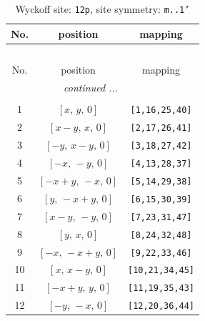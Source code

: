 \documentclass[fleqn,8pt]{jsarticle}
\begin{document}
\begin{longtable}{ccc}
\caption{Wyckoff site: {\tt 12p}, site symmetry: {\tt m..1'}}
 \\
 \hline \hline
No. & position & mapping \\ \hline \endfirsthead

\multicolumn{2}{l}{\tablename\ \thetable{}} \\
 \hline \hline
No. & position & mapping \\ \hline \endhead

 \hline \hline
\multicolumn{2}{r}{\footnotesize\it continued ...} \\ \endfoot

 \hline \hline
\multicolumn{2}{r}{} \\ \endlastfoot

1 & $\left[ x,\, y,\, 0 \right]$ & {\tt [1,16,25,40]} \\ \hline
2 & $\left[ x - y,\, x,\, 0 \right]$ & {\tt [2,17,26,41]} \\ \hline
3 & $\left[ - y,\, x - y,\, 0 \right]$ & {\tt [3,18,27,42]} \\ \hline
4 & $\left[ - x,\, - y,\, 0 \right]$ & {\tt [4,13,28,37]} \\ \hline
5 & $\left[ - x + y,\, - x,\, 0 \right]$ & {\tt [5,14,29,38]} \\ \hline
6 & $\left[ y,\, - x + y,\, 0 \right]$ & {\tt [6,15,30,39]} \\ \hline
7 & $\left[ x - y,\, - y,\, 0 \right]$ & {\tt [7,23,31,47]} \\ \hline
8 & $\left[ y,\, x,\, 0 \right]$ & {\tt [8,24,32,48]} \\ \hline
9 & $\left[ - x,\, - x + y,\, 0 \right]$ & {\tt [9,22,33,46]} \\ \hline
10 & $\left[ x,\, x - y,\, 0 \right]$ & {\tt [10,21,34,45]} \\ \hline
11 & $\left[ - x + y,\, y,\, 0 \right]$ & {\tt [11,19,35,43]} \\ \hline
12 & $\left[ - y,\, - x,\, 0 \right]$ & {\tt [12,20,36,44]} \\
\end{longtable}
\renewcommand{\arraystretch}{1.2}
\end{document}
